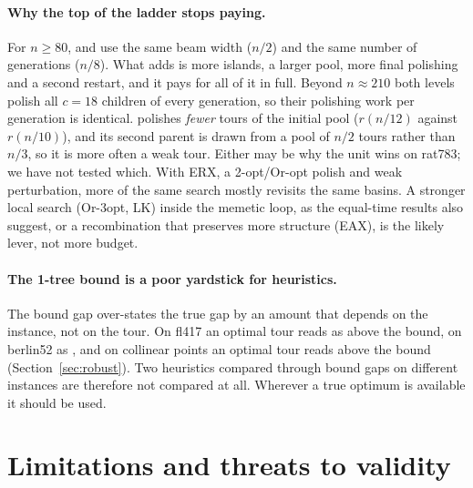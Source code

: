\paragraph{Why the top of the ladder stops paying.}
For $n\ge 80$,  and  use the same beam width ($n/2$) and the same number of
generations ($n/8$). What  adds is more islands, a larger pool, more final polishing and a
second restart, and it pays for all of it in full. Beyond $n\approx 210$ both levels polish all
$c=18$ children of every generation, so their polishing work per generation is identical.  polishes \emph{fewer} tours of the initial pool ($r(n/12)$ against $r(n/10)$), and
its second parent is drawn from a pool of $n/2$ tours rather than $n/3$, so it is more often a weak
tour. Either may be why the  unit wins on rat783; we have not tested which. With ERX, a
2-opt/Or-opt polish and weak
perturbation, more of the same search mostly revisits the same basins. A stronger local search
(Or-3opt, LK) inside the memetic loop, as the equal-time results also suggest, or a recombination that preserves more structure (EAX), is the
likely lever, not more budget.

\paragraph{The 1-tree bound is a poor yardstick for heuristics.}
The bound gap over-states the true gap by an amount that depends on the instance, not on the tour.
On fl417 an optimal tour reads as  above the bound, on berlin52 as , and on collinear points an
optimal tour reads  above the bound (Section~\ref{sec:robust}). Two heuristics compared through bound gaps on
different instances are therefore not compared at all. Wherever a true optimum is available it should
be used.

\section{Limitations and threats to validity}\label{sec:limits}

